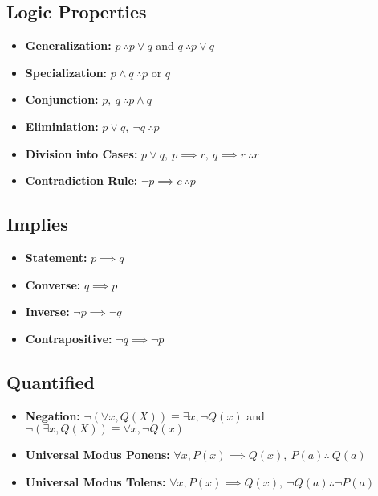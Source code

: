 \documentclass[landscape, letterpaper, 8pt]{extarticle}
\begin{document}
\begin{multicols}{2}
    \section*{Logic Properties}
    \begin{itemize}[noitemsep,nolistsep]
        \item \textbf{Generalization: } $p~\therefore p \lor q$ and $q~\therefore p \lor q$
        \item \textbf{Specialization: } $p \land q~\therefore p$ or $q$
        \item \textbf{Conjunction: } $p,~q~\therefore p \land q$
        \item \textbf{Eliminiation: } $p \lor q,~\neg q~\therefore p$
        \item \textbf{Division into Cases: } $p \lor q,~p\implies r,~q\implies r~\therefore r$
        \item \textbf{Contradiction Rule: } $\neg p \implies c~\therefore p$
    \end{itemize}
    \subsection*{Implies}
    \begin{itemize}[noitemsep,nolistsep]
        \item \textbf{Statement: } $p \implies q$
        \item \textbf{Converse: } $q \implies p$
        \item \textbf{Inverse: } $\neg p \implies \neg q$
        \item \textbf{Contrapositive: } $\neg q \implies \neg p$
    \end{itemize}
    \subsection*{Quantified}
    \begin{itemize}[noitemsep,nolistsep]
        \item \textbf{Negation: }$\neg(\forall x, Q(X)) \equiv \exists x, \neg Q(x)$ and $\neg(\exists x, Q(X)) \equiv \forall x, \neg Q(x)$
        \item \textbf{Universal Modus Ponens: } $\forall x, P(x)\implies Q(x),~P(a) \therefore~Q(a)$
        \item \textbf{Universal Modus Tolens: } $\forall x, P(x)\implies Q(x),~\neg Q(a) \therefore \neg P(a)$

    \end{itemize}

\end{multicols}
\end{document}
